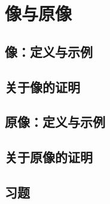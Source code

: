 \section{像与原像}

\subsection{像：定义与示例}

\subsection{关于像的证明}

\subsection{原像：定义与示例}

\subsection{关于原像的证明}

\subsection{习题}